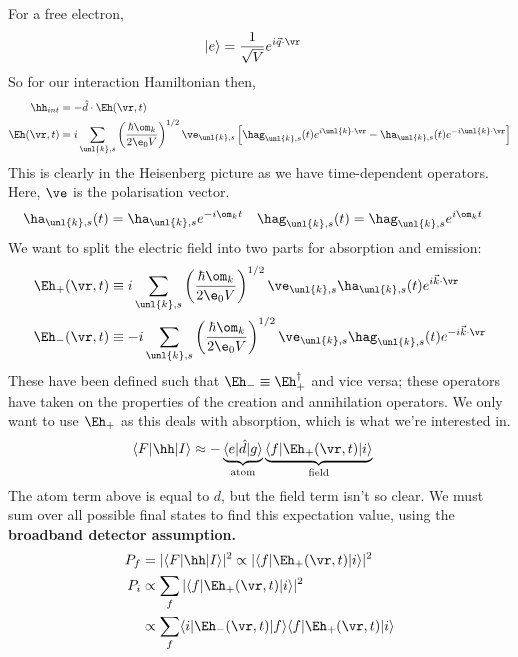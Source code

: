 \documentclass[a4paper, 11pt, normalem]{report}
\begin{document}
For a free electron, 
\begin{align}
    |e\rangle &= \frac{1}{\sqrt{V}}e^{i\vec{q}\cdot\vr}
\end{align}
So for our interaction Hamiltonian then, 
\begin{align}
    \hh_{int} &= -\hat{d}\cdot\Eh(\vr,t) \\
    \Eh(\vr,t) &= i\sum_{\unl{k},s}\left(\frac{\hbar\om_k}{2\e_0V}\right)^{1/2}\ve_{\unl{k},s}\left[\hag_{\unl{k},s}(t)e^{i\unl{k}\cdot\vr} - \ha_{\unl{k},s}(t)e^{-i\unl{k}\cdot\vr}\right]
\end{align}
This is clearly in the Heisenberg picture as we have time-dependent operators. 
Here, $\ve$ is the polarisation vector.
\begin{align}
    \ha_{\unl{k},s}(t) &= \ha_{\unl{k},s}e^{-i\om_kt} & \hag_{\unl{k},s}(t) &= \hag_{\unl{k},s}e^{i\om_kt}
\end{align}
We want to split the electric field into two parts for absorption and emission:
\begin{align}
    \Eh_+(\vr,t) &\equiv i\sum_{\unl{k},s}\left(\frac{\hbar\om_k}{2\e_0V}\right)^{1/2}\ve_{\unl{k},s}\ha_{\unl{k},s}(t)e^{i\vec{k}\cdot\vr} \\
    \Eh_-(\vr,t) &\equiv -i\sum_{\unl{k},s}\left(\frac{\hbar\om_k}{2\e_0V}\right)^{1/2}\ve_{\unl{k},s}\hag_{\unl{k},s}(t)e^{-i\vec{k}\cdot\vr} \\
\end{align}
These have been defined such that $\Eh_- \equiv \Eh_+^\dagger$ and vice versa; these operators have taken on the properties of the creation and annihilation operators. 
We only want to use $\Eh_+$ as this deals with absorption, which is what we're interested in. 
\begin{align}
    \langle F|\hh|I\rangle &\approx -\underbrace{\langle e|\hat{d}|g\rangle}_{\text{atom}} \underbrace{\langle f|\Eh_+(\vr,t)|i\rangle}_{\text{field}} 
\end{align}
The atom term above is equal to $d$, but the field term isn't so clear. 
We must sum over all possible final states to find this expectation value, using the \textbf{broadband detector assumption.}
\begin{align}
    P_f &= |\langle F|\hh|I\rangle|^2 \propto |\langle f|\Eh_+(\vr,t)|i\rangle|^2 \\
    P_i &\propto \sum_f |\langle f|\Eh_+(\vr,t)|i\rangle|^2 \\
        &\propto \sum_f \langle i|\Eh_-(\vr,t)|f\rangle\langle f|\Eh_+(\vr,t)|i\rangle
\end{align}
\end{document}

